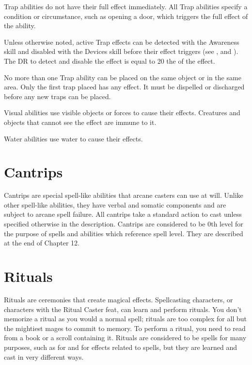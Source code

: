      Trap abilities do not have their full effect immediately.
    All Trap abilities specify a condition or circumstance, such as opening a door, which triggers the full effect of the ability.
    \par Unless otherwise noted, active Trap effects can be detected with the Awareness skill and disabled with the Devices skill before their effect triggers (see , and ).
    The DR to detect and disable the effect is equal to 20 \add the  of the effect.
    \par No more than one Trap ability can be placed on the same object or in the same area. Only the first trap placed has any effect. It must be dispelled or discharged before any new traps can be placed.

     Visual abilities use visible objects or forces to cause their effects. Creatures and objects that cannot see the effect are immune to it.

     Water abilities use water to cause their effects.

\section{Cantrips}\label{Cantrips}
    Cantrips are special spell-like abilities that arcane casters can use at will. Unlike other spell-like abilities, they have verbal and somatic components and are subject to arcane spell failure. All cantrips take a standard action to cast unless specified otherwise in the description. Cantrips are considered to be 0th level for the purpose of spells and abilities which reference spell level. They are described at the end of Chapter 12.

\section{Rituals}\label{Rituals}
    Rituals are ceremonies that create magical effects. Spellcasting characters, or characters with the Ritual Caster feat, can learn and perform rituals. You don't memorize a ritual as you would a normal spell; rituals are too complex for all but the mightiest mages to commit to memory. To perform a ritual, you need to read from a book or a scroll containing it. Rituals are considered to be spells for many purposes, such as for  and for effects related to spells, but they are learned and cast in very different ways.
